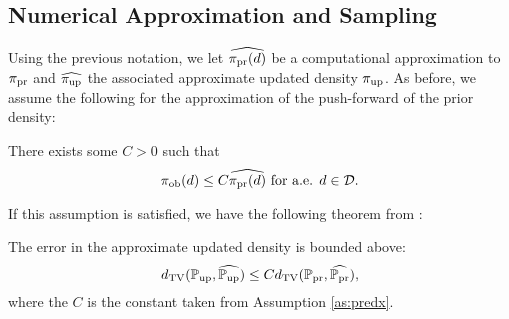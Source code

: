 \subsection{Numerical Approximation and Sampling}\label{sec:approx}
%
%
%
%




Using the previous notation, we let $\widehat{\operatorname*{\pi_{pr}}(d)}$ be a computational approximation to $\operatorname*{\pi_{pr}}$ and $\widehat{\operatorname*{\pi_{up}}}$ the associated approximate updated density $\operatorname*{\pi_{up}}$.
As before, we assume the following for the approximation of the push-forward of the prior density:
\begin{assumption}\label{as:predx}
There exists some $C>0$ such that
\[
\operatorname*{\pi_{ob}} (d) \leq C \widehat{\operatorname*{\pi_{pr}}(d)} \text{ for a.e. } d\in \mathcal{D}.
\]
\end{assumption}

If this assumption is satisfied, we have the following theorem from \cite{BJW18}:
\begin{thm}
  The error in the approximate updated density is bounded above:
  \begin{equation}\label{eq:predicted_bound}
    d_{\text{TV}} (\operatorname*{\mathbb{P}_{up}}, \widehat{\operatorname*{\mathbb{P}_{up}}}) \leq C d_{\text{TV}} (\operatorname*{\mathbb{P}_{pr}}, \widehat{\operatorname*{\mathbb{P}_{pr}}}),
  \end{equation}
  where the $C$ is the constant taken from Assumption \ref{as:predx}. 
\end{thm}

